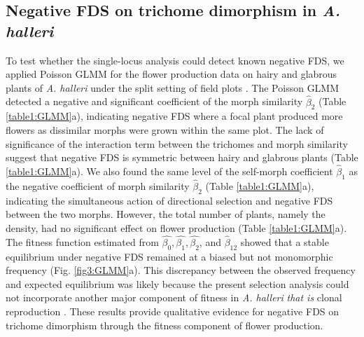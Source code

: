 \documentclass[12pt,]{article}
\begin{document}
\subsection{Negative FDS on trichome dimorphism in \textit{A. halleri}}
To test whether the single-locus analysis could detect known negative FDS, we applied Poisson GLMM for the flower production data on hairy and glabrous plants of \textit{A. halleri} under the split setting of field plots \citep{sato2017herbivore}. The Poisson GLMM detected a negative and significant coefficient of the morph similarity $\hat{\beta}_2$ (Table \ref{table1:GLMM}a), indicating negative FDS where a focal plant produced more flowers as dissimilar morphs were grown within the same plot. The lack of significance of the interaction term between the trichomes and morph similarity suggest that negative FDS is symmetric between hairy and glabrous plants (Table \ref{table1:GLMM}a). We also found the same level of the self-morph coefficient $\hat{\beta}_1$ as the negative coefficient of morph similarity $\hat{\beta}_2$ (Table \ref{table1:GLMM}a), indicating the simultaneous action of directional selection and negative FDS between the two morphs. However, the total number of plants, namely the density, had no significant effect on flower production (Table \ref{table1:GLMM}a). The fitness function estimated from $\hat{\beta_0}, \hat{\beta_1}, \hat{\beta_2}$, and $\hat{\beta}_{12}$ showed that a stable equilibrium under negative FDS remained at a biased but not monomorphic frequency (Fig. \ref{fig3:GLMM}a). This discrepancy between the observed frequency and expected equilibrium was likely because the present selection analysis could not incorporate another major component of fitness in \textit{A. halleri} \textit{that is} clonal reproduction \citep{sato2017herbivore}. These results provide qualitative evidence for negative FDS on trichome dimorphism through the fitness component of flower production.
\end{document}

